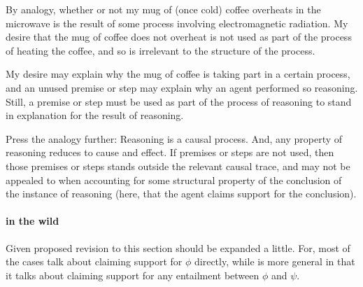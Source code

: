 \begin{note}[Analogy]
  By analogy, whether or not my mug of (once cold) coffee overheats in the microwave is the result of some process involving electromagnetic radiation.
  My desire that the mug of coffee does not overheat is not used as part of the process of heating the coffee, and so is irrelevant to the structure of the process.

  My desire may explain why the mug of coffee is taking part in a certain process, and an unused premise or step may explain why an agent performed so reasoning.
  Still, a premise or step must be used as part of the process of reasoning to stand in explanation for the result of reasoning.

  Press the analogy further: Reasoning is a causal process.
  And, any property of reasoning reduces to cause and effect.
  If premises or steps are not used, then those premises or steps stands outside the relevant causal trace, and may not be appealed to when accounting for some structural property of the conclusion of the instance of reasoning (here, that the agent claims support for the conclusion).
\end{note}

\paragraph{\ESU{} in the wild}

\begin{note}
  \color{red}
  Given proposed revision to \ESU{} this section should be expanded a little.
  For, most of the cases talk about claiming support for \(\phi\) directly, while \ESU{} is more general in that it talks about claiming support for any entailment between \(\phi\) and \(\psi\).
\end{note}

